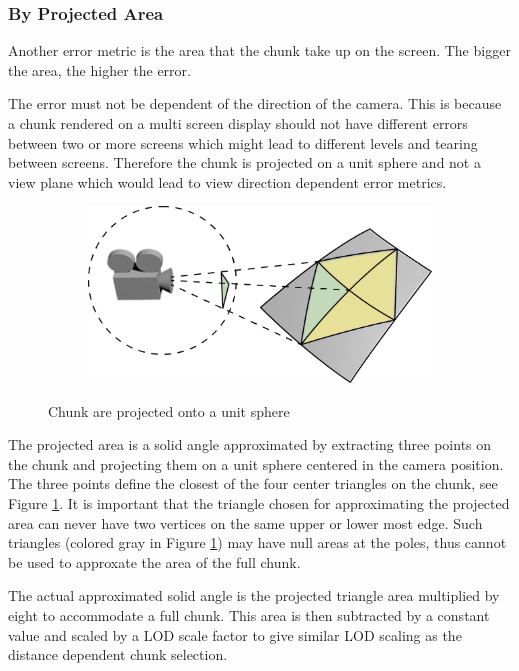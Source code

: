 \subsubsection{By Projected Area}
Another error metric is the area that the chunk take up on the screen. The bigger the area, the higher the error. 

The error must not be dependent of the direction of the camera. This is because a chunk rendered on a multi screen display should not have different errors between two or more screens which might lead to different levels and tearing between screens. Therefore the chunk is projected on a unit sphere and not a view plane which would lead to view direction dependent error metrics.

\begin{figure}[htbp]
    \centering
    \begin{subfigure}[bt]{0.5\textwidth}
        \includegraphics[width=\textwidth]{figures/implementation/chunklod/projectedarea.png}
    \end{subfigure}
    \caption{Chunk are projected onto a unit sphere}
    \label{fig:chunkprojarea}
\end{figure}

The projected area is a solid angle approximated by extracting three points on the chunk and projecting them on a unit sphere centered in the camera position. The three points define the closest of the four center triangles on the chunk, see Figure \ref{fig:chunkprojarea}. It is important that the triangle chosen for approximating the projected area can never have two vertices on the same upper or lower most edge. Such triangles (colored gray in Figure \ref{fig:chunkprojarea}) may have null areas at the poles, thus cannot be used to approxate the area of the full chunk.

The actual approximated solid angle is the projected triangle area multiplied by eight to accommodate a full chunk. This area is then subtracted by a constant value and scaled by a LOD scale factor to give similar LOD scaling as the distance dependent chunk selection.

